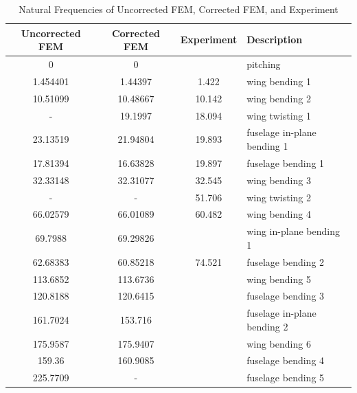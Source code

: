 \begin{table}[h]
	\centering
	\label{tab:gvtCompare}
	\caption{Natural Frequencies of Uncorrected FEM, Corrected FEM, and Experiment}
	\begin{tabular}{cccl}
		\hline\hline
		Uncorrected FEM & Corrected FEM & Experiment & Description \\
		\hline
        0 & 0 &  & pitching \\
		1.454401 & 1.44397 & 1.422 & wing bending 1 \\
        10.51099 & 10.48667 & 10.142 & wing bending 2 \\
        - & 19.1997 & 18.094 & wing twisting 1 \\
        23.13519 & 21.94804 & 19.893 & fuselage in-plane bending 1 \\
        17.81394 & 16.63828 & 19.897 & fuselage bending 1 \\
        32.33148 & 32.31077 & 32.545 & wing bending 3 \\
        - & - & 51.706 & wing twisting 2 \\
        66.02579 & 66.01089 & 60.482 & wing bending 4 \\
        69.7988 & 69.29826 & & wing in-plane bending 1 \\
        62.68383 & 60.85218 & 74.521 & fuselage bending 2 \\
        113.6852 & 113.6736 & & wing bending 5 \\
        120.8188 & 120.6415 & & fuselage bending 3 \\
        161.7024 & 153.716 & & fuselage in-plane bending 2 \\
        175.9587 & 175.9407 & & wing bending 6 \\
        159.36 & 160.9085 & & fuselage bending 4 \\
        225.7709 & - & & fuselage bending 5 \\
		\hline\hline
	\end{tabular}
\end{table}